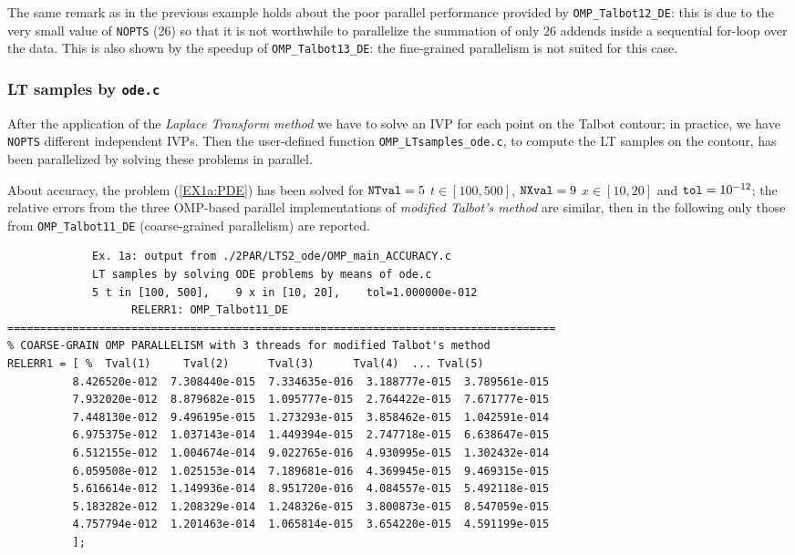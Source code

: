 \documentclass[a4paper,10pt]{report}%
\begin{document}
\noindent The same remark as in the previous example holds about the poor parallel performance provided by
{\tt OMP\_Talbot12\_DE}: this is due to the very small value of {\tt NOPTS} (26) so that it is not worthwhile to
parallelize the summation of only 26 addends inside a sequential for-loop over the data.
This is also shown by the speedup of {\tt OMP\_Talbot13\_DE}: the fine-grained parallelism is not suited for this case.


\subsubsection{LT samples by {\tt ode.c}}
After the application of the {\em Laplace Transform method} we have to solve an IVP for each point on the Talbot
contour; in practice, we have {\tt NOPTS} different independent IVPs. Then the user-defined function
{\tt OMP\_LTsamples\_ode.c}, to compute the LT samples on the contour, has been parallelized by solving these
problems in parallel.

About accuracy, the problem (\ref{EX1a:PDE}) has been solved for ${\tt NTval}=5$ $t\in[100, 500]$, ${\tt NXval}=9$
$x\in[10,20]$ and ${\tt tol}=10^{-12}$; the relative errors from the three OMP-based parallel implementations of
{\em modified Talbot's method} are similar, then in the following only those from {\tt OMP\_Talbot11\_DE}
(coarse-grained parallelism) are reported.
\begin{lstlisting}
             Ex. 1a: output from ./2PAR/LTS2_ode/OMP_main_ACCURACY.c
             LT samples by solving ODE problems by means of ode.c
             5 t in [100, 500],    9 x in [10, 20],    tol=1.000000e-012
                   RELERR1: OMP_Talbot11_DE
====================================================================================
% COARSE-GRAIN OMP PARALLELISM with 3 threads for modified Talbot's method
RELERR1 = [ %  Tval(1)     Tval(2)      Tval(3)      Tval(4)  ... Tval(5)
          8.426520e-012  7.308440e-015  7.334635e-016  3.188777e-015  3.789561e-015
          7.932020e-012  8.879682e-015  1.095777e-015  2.764422e-015  7.671777e-015
          7.448130e-012  9.496195e-015  1.273293e-015  3.858462e-015  1.042591e-014
          6.975375e-012  1.037143e-014  1.449394e-015  2.747718e-015  6.638647e-015
          6.512155e-012  1.004674e-014  9.022765e-016  4.930995e-015  1.302432e-014
          6.059508e-012  1.025153e-014  7.189681e-016  4.369945e-015  9.469315e-015
          5.616614e-012  1.149936e-014  8.951720e-016  4.084557e-015  5.492118e-015
          5.183282e-012  1.208329e-014  1.248326e-015  3.800873e-015  8.547059e-015
          4.757794e-012  1.201463e-014  1.065814e-015  3.654220e-015  4.591199e-015
          ];
\end{lstlisting}
\end{document}
